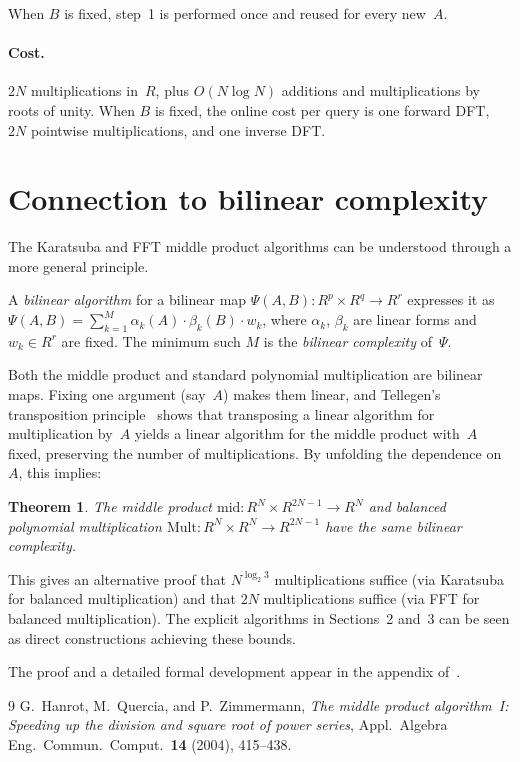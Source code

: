 \documentclass[11pt]{article}
\newcommand{\midd}{\mathrm{mid}}
\theoremstyle{plain}
\newtheorem{theorem}{Theorem}
\theoremstyle{remark}
\begin{document}
\noindent
When $B$ is fixed, step~1 is performed once
and reused for every new~$A$.

\paragraph{Cost.}
$2N$ multiplications in~$R$,
plus $O(N \log N)$ additions
and multiplications by roots of unity.
When $B$ is fixed, the online cost per query
is one forward DFT, $2N$ pointwise multiplications,
and one inverse DFT.

\section{Connection to bilinear complexity}

The Karatsuba and FFT middle product algorithms
can be understood through a more general principle.

\medskip
A \emph{bilinear algorithm} for a bilinear map
$\Psi(A, B) \colon R^p \times R^q \to R^r$
expresses it as
$\Psi(A,B) = \sum_{k=1}^{M} \alpha_k(A) \cdot \beta_k(B) \cdot w_k$,
where $\alpha_k$, $\beta_k$ are linear forms
and $w_k \in R^r$ are fixed.
The minimum such $M$ is the \emph{bilinear complexity}
of~$\Psi$.

Both the middle product and standard polynomial multiplication
are bilinear maps.
Fixing one argument (say~$A$) makes them linear,
and Tellegen's transposition principle~\cite{HQZ04}
shows that transposing a linear algorithm
for multiplication by~$A$
yields a linear algorithm for the middle product with~$A$ fixed,
preserving the number of multiplications.
By unfolding the dependence on~$A$,
this implies:

\begin{theorem}
The middle product
$\midd \colon R^N \times R^{2N-1} \to R^N$
and balanced polynomial multiplication
$\mathrm{Mult} \colon R^N \times R^N \to R^{2N-1}$
have the same bilinear complexity.
\end{theorem}

This gives an alternative proof that
$N^{\log_2 3}$ multiplications suffice
(via Karatsuba for balanced multiplication)
and that $2N$ multiplications suffice
(via FFT for balanced multiplication).
The explicit algorithms in Sections~2 and~3
can be seen as direct constructions achieving these bounds.

The proof and a detailed formal development
appear in the appendix of~\cite{HQZ04}.

\begin{thebibliography}{9}
G.~Hanrot, M.~Quercia, and P.~Zimmermann,
\emph{The middle product algorithm~I: Speeding up the division
and square root of power series},
Appl.\ Algebra Eng.\ Commun.\ Comput.\ \textbf{14} (2004), 415--438.
\end{thebibliography}
\end{document}
